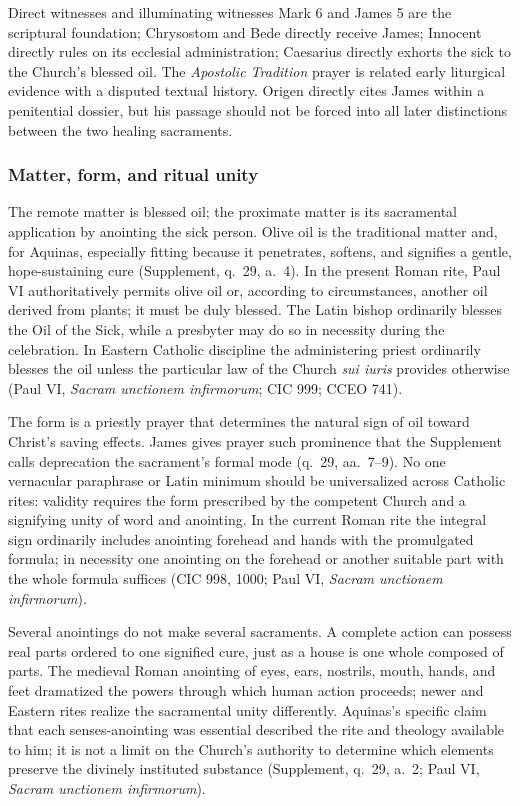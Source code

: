 \begin{studybox}{Direct witnesses and illuminating witnesses}
Mark 6 and James 5 are the scriptural foundation; Chrysostom and Bede directly receive James; Innocent directly rules on its ecclesial administration; Caesarius directly exhorts the sick to the Church's blessed oil. The \emph{Apostolic Tradition} prayer is related early liturgical evidence with a disputed textual history. Origen directly cites James within a penitential dossier, but his passage should not be forced into all later distinctions between the two healing sacraments.
\end{studybox}

\subsubsection{Matter, form, and ritual unity}

The remote matter is blessed oil; the proximate matter is its sacramental application by anointing the sick person. Olive oil is the traditional matter and, for Aquinas, especially fitting because it penetrates, softens, and signifies a gentle, hope-sustaining cure (Supplement, q.~29, a.~4). In the present Roman rite, Paul VI authoritatively permits olive oil or, according to circumstances, another oil derived from plants; it must be duly blessed. The Latin bishop ordinarily blesses the Oil of the Sick, while a presbyter may do so in necessity during the celebration. In Eastern Catholic discipline the administering priest ordinarily blesses the oil unless the particular law of the Church \emph{sui iuris} provides otherwise (Paul VI, \emph{Sacram unctionem infirmorum}; CIC 999; CCEO 741).

The form is a priestly prayer that determines the natural sign of oil toward Christ's saving effects. James gives prayer such prominence that the Supplement calls deprecation the sacrament's formal mode (q.~29, aa.~7--9). No one vernacular paraphrase or Latin minimum should be universalized across Catholic rites: validity requires the form prescribed by the competent Church and a signifying unity of word and anointing. In the current Roman rite the integral sign ordinarily includes anointing forehead and hands with the promulgated formula; in necessity one anointing on the forehead or another suitable part with the whole formula suffices (CIC 998, 1000; Paul VI, \emph{Sacram unctionem infirmorum}).

Several anointings do not make several sacraments. A complete action can possess real parts ordered to one signified cure, just as a house is one whole composed of parts. The medieval Roman anointing of eyes, ears, nostrils, mouth, hands, and feet dramatized the powers through which human action proceeds; newer and Eastern rites realize the sacramental unity differently. Aquinas's specific claim that each senses-anointing was essential described the rite and theology available to him; it is not a limit on the Church's authority to determine which elements preserve the divinely instituted substance (Supplement, q.~29, a.~2; Paul VI, \emph{Sacram unctionem infirmorum}).

